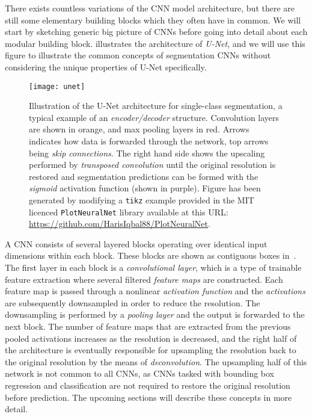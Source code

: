 There exists countless variations of the CNN model architecture, but there are still some elementary building blocks which they often have in common.
We will start by sketching generic big picture of CNNs before going into detail about each modular building block.
 illustrates the architecture of \textit{U-Net}, and we will use this figure to illustrate the common concepts of segmentation CNNs without considering the unique properties of U-Net specifically.

\begin{figure}[H]
  \texttt{[image: unet]}
  \caption{%
    Illustration of the U-Net architecture for single-class segmentation, a typical example of an \textit{encoder/decoder} structure.
    Convolution layers are shown in orange, and max pooling layers in red.
    Arrows indicates how data is forwarded through the network, top arrows being \textit{skip connections}.
    The right hand side shows the upscaling performed by \textit{transposed convolution} until the original resolution is restored and segmentation predictions can be formed with the \textit{sigmoid} activation function (shown in purple).
    Figure has been generated by modifying a \texttt{tikz} example provided in the MIT licenced \texttt{PlotNeuralNet} library available at this URL:\@
    \protect\url{https://github.com/HarisIqbal88/PlotNeuralNet}.
  }%
  \label{fig:unet}
\end{figure}

A CNN consists of several layered blocks operating over identical input dimensions within each block.
These blocks are shown as contiguous boxes in~.
The first layer in each block is a \textit{convolutional layer}, which is a type of trainable feature extraction where several filtered \textit{feature maps} are constructed.
Each feature map is passed through a nonlinear \textit{activation function} and the \textit{activations} are subsequently downsampled in order to reduce the resolution.
The downsampling is performed by a \textit{pooling layer} and the output is forwarded to the next block.
The number of feature maps that are extracted from the previous pooled activations increases as the resolution is decreased, and the right half of the architecture is eventually responsible for upsampling the resolution back to the original resolution by the means of \textit{deconvolution}.
The upsampling half of this network is not common to all CNNs, as CNNs tasked with bounding box regression and classification are not required to restore the original resolution before prediction.
The upcoming sections will describe these concepts in more detail.
